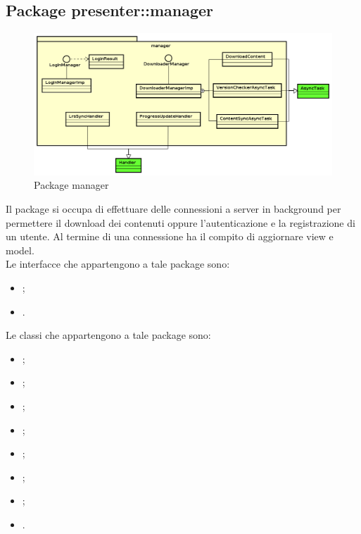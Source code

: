 \documentclass[../Tesi.tex]{subfiles}
\begin{document}
	\subsection{Package presenter::manager}
		\begin{figure}[H]
			\centering
			\includegraphics[scale=0.4]{images/package_diagrams/manager}
				\caption{Package manager}
		\end{figure}
		Il package  si occupa di effettuare delle connessioni a server in background per permettere il download dei contenuti oppure l'autenticazione e la registrazione di un utente. Al termine di una connessione ha il compito di aggiornare view e model. \\
		Le interfacce che appartengono a tale package sono:
		\begin{itemize}
			\item {};
			\item {}.
		\end{itemize}
		Le classi che appartengono a tale package sono:
		\begin{itemize}
			\item {};
			\item {};
			\item {};
			\item {};
			\item {};
			\item {};
			\item {};
			\item {}.
		\end{itemize}
\end{document}
